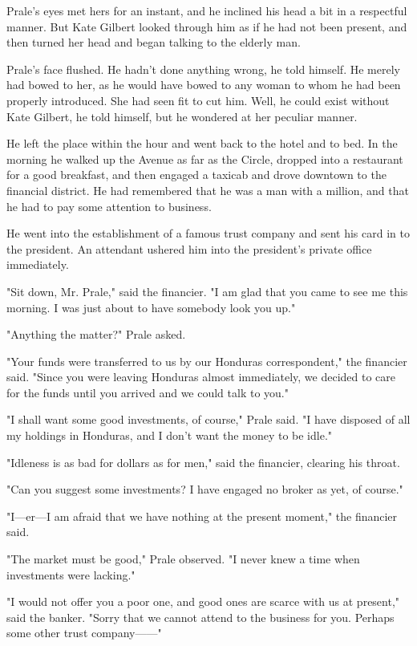 \documentclass{novel}
\begin{document}
Prale's eyes met hers for an instant, and he inclined his head a bit in a respectful manner. But Kate Gilbert looked through him as if he had not been present, and then turned her head and began talking to the elderly man.

Prale's face flushed. He hadn't done anything wrong, he told himself. He merely had bowed to her, as he would have bowed to any woman to whom he had been properly introduced. She had seen fit to cut him. Well, he could exist without Kate Gilbert, he told himself, but he wondered at her peculiar manner.

He left the place within the hour and went back to the hotel and to bed. In the morning he walked up the Avenue as far as the Circle, dropped into a restaurant for a good breakfast, and then engaged a taxicab and drove downtown to the financial district. He had remembered that he was a man with a million, and that he had to pay some attention to business.

He went into the establishment of a famous trust company and sent his card in to the president. An attendant ushered him into the president's private office immediately.

"Sit down, Mr. Prale," said the financier. "I am glad that you came to see me this morning. I was just about to have somebody look you up."

"Anything the matter?" Prale asked.

"Your funds were transferred to us by our Honduras correspondent," the financier said. "Since you were leaving Honduras almost immediately, we decided to care for the funds until you arrived and we could talk to you."

"I shall want some good investments, of course," Prale said. "I have disposed of all my holdings in Honduras, and I don't want the money to be idle."

"Idleness is as bad for dollars as for men," said the financier, clearing his throat.

"Can you suggest some investments? I have engaged no broker as yet, of course."

"I---er---I am afraid that we have nothing at the present moment," the financier said.

"The market must be good," Prale observed. "I never knew a time when investments were lacking."

"I would not offer you a poor one, and good ones are scarce with us at present," said the banker. "Sorry that we cannot attend to the business for you. Perhaps some other trust company------"
\end{document}
